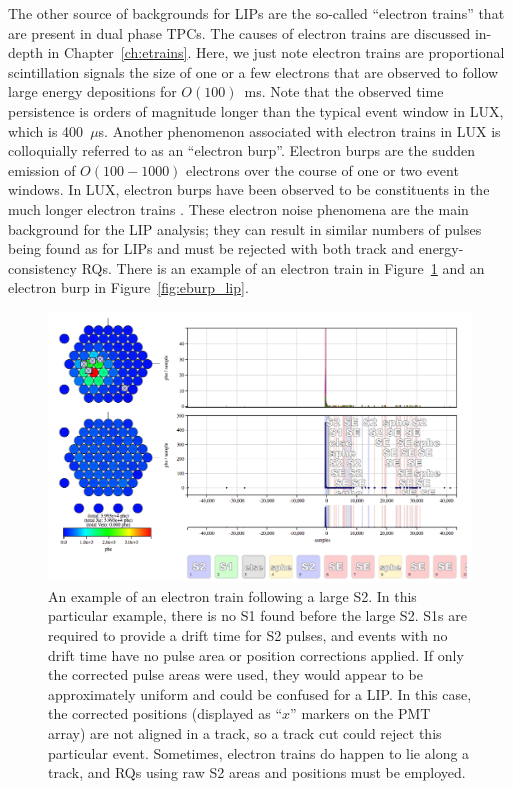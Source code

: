 The other source of backgrounds for \ac{LIP}s are the so-called ``electron trains'' that are present in dual phase \ac{TPC}s. The causes of electron trains are discussed in-depth in Chapter~\ref{ch:etrains}. Here, we just note electron trains are proportional scintillation signals the size of one or a few electrons that are observed to follow large energy depositions for $O(100)$~ms. Note that the observed time persistence is orders of magnitude longer than the typical event window in \ac{LUX}, which is 400~$\mu$s. Another phenomenon associated with electron trains in \ac{LUX} is colloquially referred to as an ``electron burp''. Electron burps are the sudden emission of $O(100-1000)$ electrons over the course of one or two event windows. In \ac{LUX}, electron burps have been observed to be constituents in the much longer electron trains \cite{Xu2016}. These electron noise phenomena are the main background for the \ac{LIP} analysis; they can result in similar numbers of pulses being found as for \ac{LIP}s and must be rejected with both track and energy-consistency \ac{RQ}s. There is an example of an electron train in Figure~\ref{fig:etrain_lip} and an electron burp in Figure~\ref{fig:eburp_lip}. 

\begin{figure}[htbp]
\begin{center}
\includegraphics[width=\textwidth]{figures/lips/etrain.png}
\caption{An example of an electron train following a large S2. In this particular example, there is no S1 found before the large S2. S1s are required to provide a drift time for S2 pulses, and events with no drift time have no pulse area or position corrections applied. If only the corrected pulse areas were used, they would appear to be approximately uniform and could be confused for a \acs{LIP}. In this case, the corrected positions (displayed as ``$x$'' markers on the \acs{PMT} array) are not aligned in a track, so a track cut could reject this particular event. Sometimes, electron trains do happen to lie along a track, and \acs{RQ}s using raw S2 areas and positions must be employed. }
\label{fig:etrain_lip}
\end{center}
\end{figure}

